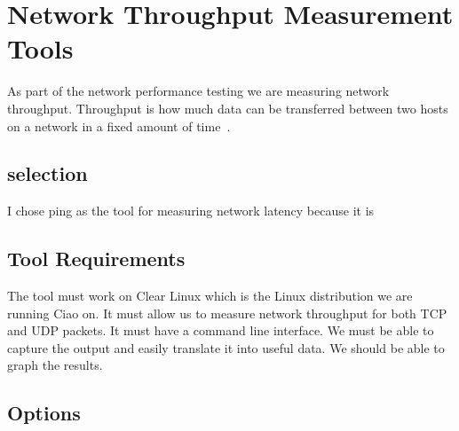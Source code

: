 \documentclass[10pt,letterpaper,onecolumn,draftclsnofoot]{IEEEtran}
\begin{document}
\section{Network Throughput Measurement Tools}
As part of the network performance testing we are measuring network throughput.
Throughput is how much data can be transferred between two hosts on a network in a fixed amount of time~\cite{topdown-ssl}.

\subsection{selection}
I chose ping as the tool for measuring network latency because it is 

\subsection{Tool Requirements}
The tool must work on Clear Linux which is the Linux distribution we are running Ciao on.
It must allow us to measure network throughput for both TCP and UDP packets. 
It must have a command line interface.
We must be able to capture the output and easily translate it into useful data. 
We should be able to graph the results. 

\subsection{Options}
\end{document}
